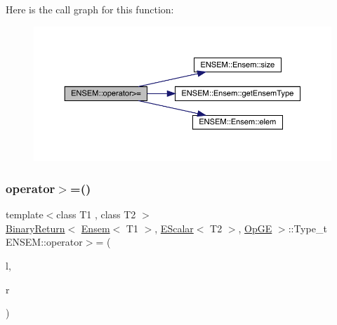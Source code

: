 Here is the call graph for this function\+:\nopagebreak
\begin{figure}[H]
\begin{center}
\leavevmode
\includegraphics[width=350pt]{d1/d9e/group__eensem_gab4cf01cccb06cf4c911567c3ee6eb808_cgraph}
\end{center}
\end{figure}
\mbox{\label{group__eensem_gaefcc523be9266958f63fc6b34c2671e8}} 
\subsubsection{\texorpdfstring{operator$>$=()}{operator>=()}\hspace{0.1cm}{\footnotesize\ttfamily [2/3]}}
{\footnotesize\ttfamily template$<$class T1 , class T2 $>$ \\
\mbox{\hyperlink{structENSEM_1_1BinaryReturn}{Binary\+Return}}$<$ \mbox{\hyperlink{classENSEM_1_1Ensem}{Ensem}}$<$ T1 $>$, \mbox{\hyperlink{classENSEM_1_1EScalar}{E\+Scalar}}$<$ T2 $>$, \mbox{\hyperlink{structENSEM_1_1OpGE}{Op\+GE}} $>$\+::Type\+\_\+t E\+N\+S\+E\+M\+::operator$>$= (\begin{DoxyParamCaption}\item[{const \mbox{\hyperlink{classENSEM_1_1Ensem}{Ensem}}$<$ T1 $>$ \&}]{l,  }\item[{const \mbox{\hyperlink{classENSEM_1_1EScalar}{E\+Scalar}}$<$ T2 $>$ \&}]{r }\end{DoxyParamCaption})\hspace{0.3cm}{\ttfamily [inline]}}

